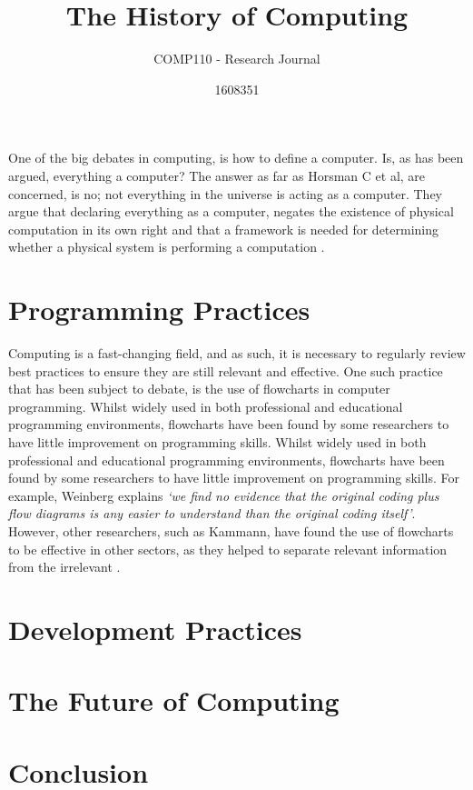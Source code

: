 \documentclass{scrartcl}
\title{The History of Computing}
\subtitle{COMP110 - Research Journal}
\author{1608351}
\begin{document}
One of the big debates in computing, is how to define a computer. Is, as has been argued, everything a computer? The answer as far as Horsman C et al, are concerned, is no; not everything in the universe is acting as a computer. They argue that declaring everything as a computer, negates the existence of physical computation in its own right and that a framework is needed for determining whether a physical system is performing a computation \cite{Horsman2014}.

\section{Programming Practices}
Computing is a fast-changing field, and as such, it is necessary to regularly review best practices to ensure they are still relevant and effective. One such practice that has been subject to debate, is the use of flowcharts in computer programming. Whilst widely used in both professional and educational programming environments, flowcharts have been found by some researchers to have little improvement on programming skills. Whilst widely used in both professional and educational programming environments, flowcharts have been found by some researchers to have little improvement on programming skills. For example, Weinberg explains \textit{`we find no evidence that the original coding plus flow diagrams is any easier to understand than the original coding itself'}\cite{Weinberg}. However, other researchers, such as Kammann, have found the use of flowcharts to be effective in other sectors, as they helped to separate relevant information from the irrelevant \cite{Kammann1975}.

\section{Development Practices}


\section{The Future of Computing}
 

\section{Conclusion}





\end{document}
